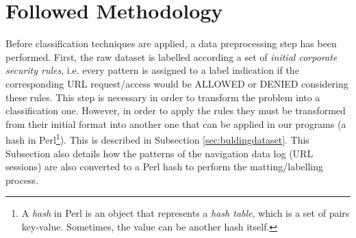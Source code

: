 \documentclass{llncs}
\begin{document}

\section{Followed Methodology}
\label{sec:methodology}

\noindent Before classification techniques are applied, a data preprocessing step has been performed. First, the raw dataset is labelled according a set of \textit{initial corporate security rules}, i.e. every pattern is assigned to a label indication if the corresponding URL request/access would be ALLOWED or DENIED considering these rules. This step is necessary in order to transform the problem into a classification one. However, in order to apply the rules they must be transformed from their initial format into another one that can be applied in our programs (a hash in Perl\footnote{A \textit{hash} in Perl is an object that represents a \textit{hash table}, which is a set of pairs key-value. Sometimes, the value can be another hash itself.}). This is described in Subsection \ref{sec:buldingdataset}. This Subsection also details how the patterns of the navigation data log (URL sessions) are also converted to a Perl hash to perform the matting/labelling process.
\end{document}
